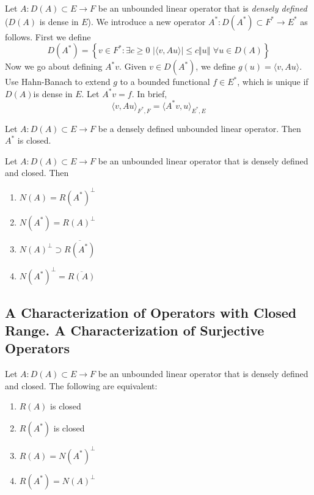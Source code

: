 \begin{defn}
	Let $A: D(A) \subset E \to F$ be an unbounded linear operator that is \textit{densely defined} ($D(A)$ is dense in $E$). We introduce a new operator $A^{*}: D(A^{*}) \subset F^{*} \to E^{*}$ as follows. First we define
	\[
		D(A^{*}) = \left\{ v \in F^{*}: \exists c \geq 0 \hspace{4pt} \vert \langle v, Au \rangle \vert \leq c \Vert u \Vert \hspace{4pt} \forall u \in D(A) \right\}
	\]
	Now we go about defining $A^{*}v$. Given $v \in D(A^{*})$, we define $g(u) = \langle v, Au \rangle$. Use Hahn-Banach to extend $g$ to a bounded functional $f \in E^{*}$, which is unique if $D(A)$is dense in $E$. Let $A^{*}v = f$. In brief, 
	\[
	\langle v, Au \rangle_{F^{*}, F} = \langle A^{*}v, u \rangle_{E^{*},E}
	\]
	
\end{defn}

\begin{prop}
	Let $A: D(A) \subset E \to F$ be a densely defined unbounded linear operator. Then $A^{*}$ is closed. 
\end{prop}

\begin{cor}
	Let $A: D(A) \subset E \to F$ be an unbounded linear operator that is densely defined and closed. Then
	\begin{enumerate}
		\item $N(A) = R(A^{*})^{\perp}$
		\item $N(A^{*}) = R(A)^{\perp}$
		\item $N(A)^{\perp} \supset \overline{R(A^{*})}$
		\item $N(A^{*})^{\perp} = \overline{R(A)}$
	\end{enumerate}
\end{cor}

\subsection{A Characterization of Operators with Closed Range. A Characterization of Surjective Operators}

\begin{thm}
	Let $A: D(A) \subset E \to F$ be an unbounded linear operator that is densely defined and closed. The following are equivalent:
	\begin{enumerate}
		\item $R(A)$ is closed
		\item $R(A^{*})$ is closed
		\item $R(A) = N(A^{*})^{\perp}$
		\item $R(A^{*}) = N(A)^{\perp}$
	\end{enumerate}
\end{thm}

